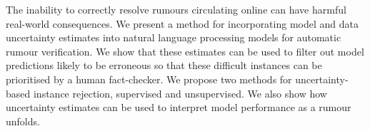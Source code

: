 The inability to correctly resolve rumours circulating online can have harmful real-world consequences.  We present a method for incorporating model and data uncertainty estimates into natural language processing models for automatic rumour verification.  We show that these estimates can be used to filter out model predictions likely to be erroneous so that these difficult instances can be prioritised by a human fact-checker. We propose two methods for uncertainty-based instance rejection, supervised and unsupervised. We also show how uncertainty estimates can be used to interpret model performance as a rumour unfolds.
